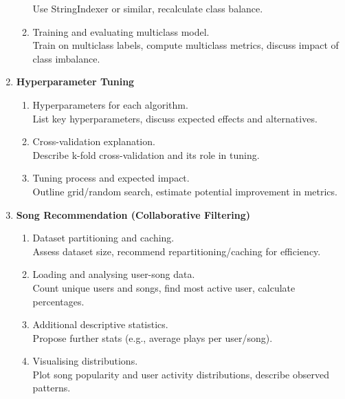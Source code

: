 \begin{enumerate}
\begin{enumerate}
      Use StringIndexer or similar, recalculate class balance.
      \item Training and evaluating multiclass model.\\
      Train on multiclass labels, compute multiclass metrics, discuss impact of class imbalance.
    \end{enumerate}
  \item \textbf{Hyperparameter Tuning}
    \begin{enumerate}
      \item Hyperparameters for each algorithm.\\
      List key hyperparameters, discuss expected effects and alternatives.
      \item Cross-validation explanation.\\
      Describe k-fold cross-validation and its role in tuning.
      \item Tuning process and expected impact.\\
      Outline grid/random search, estimate potential improvement in metrics.
    \end{enumerate}
  \item \textbf{Song Recommendation (Collaborative Filtering)}
    \begin{enumerate}
      \item Dataset partitioning and caching.\\
      Assess dataset size, recommend repartitioning/caching for efficiency.
      \item Loading and analysing user-song data.\\
      Count unique users and songs, find most active user, calculate percentages.
      \item Additional descriptive statistics.\\
      Propose further stats (e.g., average plays per user/song).
      \item Visualising distributions.\\
      Plot song popularity and user activity distributions, describe observed patterns.
    \end{enumerate}
\end{enumerate}
